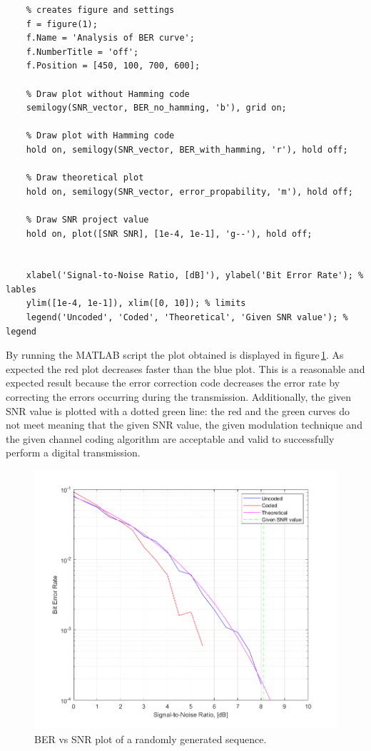 \begin{lstlisting}
    % creates figure and settings
    f = figure(1);
    f.Name = 'Analysis of BER curve';
    f.NumberTitle = 'off';
    f.Position = [450, 100, 700, 600];
    
    % Draw plot without Hamming code
    semilogy(SNR_vector, BER_no_hamming, 'b'), grid on;

    % Draw plot with Hamming code
    hold on, semilogy(SNR_vector, BER_with_hamming, 'r'), hold off;

    % Draw theoretical plot
    hold on, semilogy(SNR_vector, error_propability, 'm'), hold off;

    % Draw SNR project value
    hold on, plot([SNR SNR], [1e-4, 1e-1], 'g--'), hold off;

    
    xlabel('Signal-to-Noise Ratio, [dB]'), ylabel('Bit Error Rate'); % lables
    ylim([1e-4, 1e-1]), xlim([0, 10]); % limits
    legend('Uncoded', 'Coded', 'Theoretical', 'Given SNR value'); % legend
\end{lstlisting}

\noindent By running the MATLAB script the plot obtained is displayed in figure\,\ref{fig:BER-plot}. As expected the red plot decreases faster than the blue plot. This is a reasonable and expected result because the error correction code decreases the error rate by correcting the errors occurring during the transmission. Additionally, the given SNR value is plotted with a dotted green line: the red and the green curves do not meet meaning that the given SNR value, the given modulation technique and the given channel coding algorithm are acceptable and valid to successfully perform a digital transmission. 

\begin{figure}[h]
    \centering
    \includegraphics[width = \textwidth]{../res/imgs/BER-plot.png}
    \caption{BER vs SNR plot of a randomly generated sequence.}
    \label{fig:BER-plot}
\end{figure}

